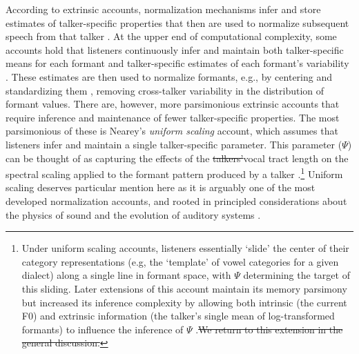 \documentclass[preprint]{JASA}
\providecommand{\DIFadd}[1]{{\protect\color{blue}\uwave{#1}}} %
\providecommand{\DIFdel}[1]{{\protect\color{red}\sout{#1}}}                      %
\providecommand{\DIFaddbegin}{} %
\providecommand{\DIFaddend}{} %
\providecommand{\DIFdelbegin}{} %
\providecommand{\DIFdelend}{} %
\begin{document}
According to extrinsic accounts, normalization mechanisms infer and store estimates of talker-specific properties that then are used to normalize subsequent speech from that talker \DIFdelbegin %
\DIFdelend \DIFaddbegin \citetext{\citealp{gerstman1968}; \citealp{lobanov1971}; \citealp{nearey1978}; \citealp{nordstrom-lindblom1975}; \citealp{watt-fabricius2002}; \citealp[for review, see][]{weatherholtz-jaeger2016}}\DIFaddend . At the upper end of computational complexity, some accounts hold that listeners continuously infer and maintain both talker-specific means for each formant and talker-specific estimates of each formant's variability \citep{gerstman1968, lobanov1971}. These estimates are then used to normalize formants, e.g., by centering and standardizing them \citep[essentially z-scoring formants,][]{lobanov1971}, removing cross-talker variability in the distribution of formant values. There are, however, more parsimonious extrinsic accounts that require inference and maintenance of fewer talker-specific properties. The most parsimonious of these is Nearey's \emph{uniform scaling} account, which assumes that listeners infer and maintain a single talker-specific parameter. This parameter (\(\Psi\)) can be thought of as capturing the effects of the \DIFdelbegin \DIFdel{talkers'}\DIFdelend \DIFaddbegin \DIFadd{talker's }\DIFaddend vocal tract length on the spectral scaling applied to the formant pattern produced by a talker \citep{nearey1978}.\footnote{Under uniform scaling accounts, listeners essentially `slide' the center of their category representations (e.g, the `template' of vowel categories for a given dialect) along a single line in formant space, with \(\Psi\) determining the target of this sliding. Later extensions of this account maintain its memory parsimony but increased its inference complexity by allowing both intrinsic (the current F0) and extrinsic information (the talker's single mean of log-transformed formants) to influence the inference of \(\Psi\) \citep{nearey-assmann2007}.\DIFdelbegin \DIFdel{We return to this extension in the general discussion.}\DIFdelend } Uniform scaling deserves particular mention here as it is arguably one of the most developed normalization accounts, and rooted in principled considerations about the physics of sound and the evolution of auditory systems \citep[for review, see][]{barreda2020}.
\end{document}
